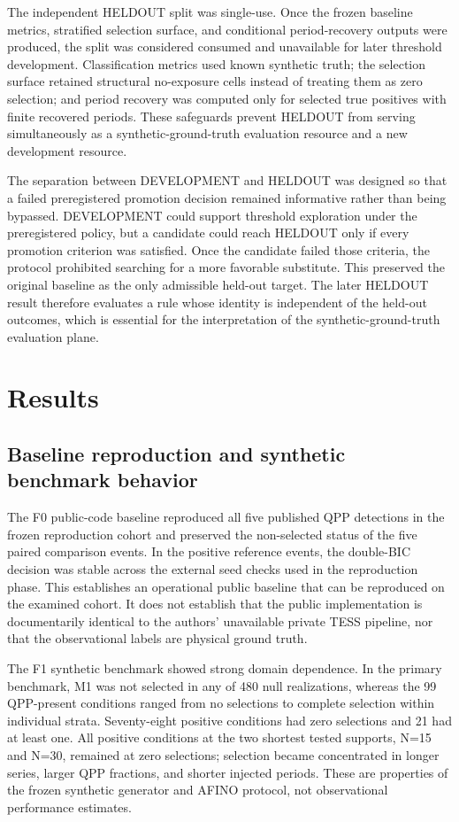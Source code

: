 \documentclass[11pt,a4paper]{article}
\begin{document}
The independent HELDOUT split was single-use. Once the frozen baseline metrics, stratified selection surface, and conditional period-recovery outputs were produced, the split was considered consumed and unavailable for later threshold development. Classification metrics used known synthetic truth; the selection surface retained structural no-exposure cells instead of treating them as zero selection; and period recovery was computed only for selected true positives with finite recovered periods. These safeguards prevent HELDOUT from serving simultaneously as a synthetic-ground-truth evaluation resource and a new development resource.

The separation between DEVELOPMENT and HELDOUT was designed so that a failed preregistered promotion decision remained informative rather than being bypassed. DEVELOPMENT could support threshold exploration under the preregistered policy, but a candidate could reach HELDOUT only if every promotion criterion was satisfied. Once the candidate failed those criteria, the protocol prohibited searching for a more favorable substitute. This preserved the original baseline as the only admissible held-out target. The later HELDOUT result therefore evaluates a rule whose identity is independent of the held-out outcomes, which is essential for the interpretation of the synthetic-ground-truth evaluation plane.

\section{Results}
\subsection{Baseline reproduction and synthetic benchmark behavior}
The F0 public-code baseline reproduced all five published QPP detections in the frozen reproduction cohort and preserved the non-selected status of the five paired comparison events. In the positive reference events, the double-BIC decision was stable across the external seed checks used in the reproduction phase. This establishes an operational public baseline that can be reproduced on the examined cohort. It does not establish that the public implementation is documentarily identical to the authors' unavailable private TESS pipeline, nor that the observational labels are physical ground truth.

The F1 synthetic benchmark showed strong domain dependence. In the primary benchmark, M1 was not selected in any of 480 null realizations, whereas the 99 QPP-present conditions ranged from no selections to complete selection within individual strata. Seventy-eight positive conditions had zero selections and 21 had at least one. All positive conditions at the two shortest tested supports, N=15 and N=30, remained at zero selections; selection became concentrated in longer series, larger QPP fractions, and shorter injected periods. These are properties of the frozen synthetic generator and AFINO protocol, not observational performance estimates.
\end{document}
